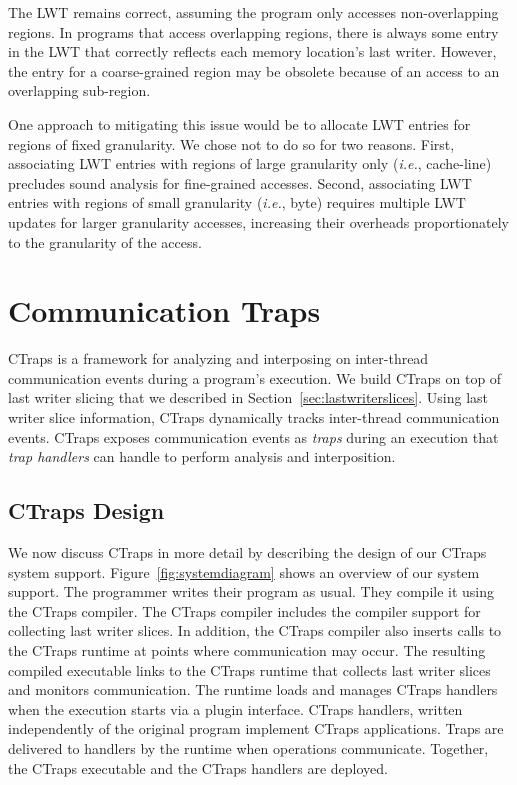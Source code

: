 \documentclass[preprint,9pt]{sigplanconf}
\newcommand{\ctraps}{CTraps\xspace}
\newcommand{\lwt}{LWT\xspace}
\begin{document}
The \lwt remains correct, assuming the program only accesses non-overlapping
regions.  In programs that access overlapping regions, there is always some
entry in the \lwt that correctly reflects each memory location's last writer.
However, the entry for a coarse-grained region may be obsolete because of an
access to an overlapping sub-region.

One approach to mitigating this issue would be to allocate \lwt entries for
regions of fixed granularity.  We chose not to do so for two reasons.  First,
associating \lwt entries with regions of  large granularity only ({\em i.e.},
cache-line) precludes sound analysis for fine-grained accesses.  Second,
associating \lwt entries with regions of small granularity ({\em i.e.}, byte)
requires multiple \lwt updates for larger granularity accesses, increasing
their overheads proportionately to the granularity of the access.





\section{Communication Traps}
\label{sec:ctraps}

\ctraps is a framework for analyzing and interposing on inter-thread
communication events during a program's execution.  We build \ctraps on top of
last writer slicing that we described in Section~\ref{sec:lastwriterslices}.
Using last writer slice information, \ctraps dynamically tracks 
inter-thread communication events. \ctraps exposes communication
events as {\em traps} during an execution that {\em trap handlers} can handle
to perform analysis and interposition.  

\subsection{\ctraps Design}

We now discuss \ctraps in more detail by describing the design of our \ctraps
system support.  Figure~\ref{fig:systemdiagram} shows an overview of our system
support.  The programmer writes their program as usual.  They compile it using
the \ctraps compiler. The \ctraps compiler includes the compiler support for
collecting last writer slices.  In addition, the \ctraps compiler also inserts
calls to the \ctraps runtime at points where communication may occur.  The
resulting compiled executable links to the \ctraps runtime that collects last
writer slices and monitors communication.  The runtime loads and manages \ctraps
handlers when the execution starts via a plugin interface.  \ctraps handlers,
written independently of the original program implement \ctraps applications.
Traps are delivered to handlers by the runtime when operations communicate.
Together, the \ctraps executable and the \ctraps handlers are deployed.
\end{document}
